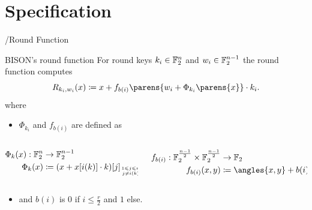 \section{Specification}
\begin{frame}{\bison/}{Round Function}
    \vspace{-45pt}
    \begin{minipage}[t][150pt][t]{0.985\textwidth}
        \begin{block}{BISON's round function\vpPp}
            \centering
            \vspace{0.5\baselineskip}
            For round keys $k_i\in \mathbb{F}_2^n$ and $w_i\in \mathbb{F}_2^{n-1}$ the round function computes
            \begin{equation*}
                R_{k_i, w_i}(x) \coloneqq x + f_{b(i)} \parens{w_i + \Phi_{k_i}\parens{x}} \cdot k_i.
            \end{equation*}
            \flushleft
            where
            \begin{itemize}
                \item $\Phi_{k_i}$ and $f_{b(i)}$ are defined as
            \end{itemize}
            \vspace{-10pt}
            \begin{columns}
                \begin{column}{0.49\textwidth}
                    \begin{align*}
                        \Phi_k(x) : \F_2^n &\to \F_2^{n-1} \\
                        \Phi_k(x) &\coloneqq (x + x[i(k)] \cdot k)[j]_{\tower{1 \leqslant j \leqslant n}{j \neq i(k)}}
                    \end{align*}
                \end{column}
                \begin{column}{0.49\textwidth}
                    \begin{align*}
                        f_{b(i)} : \F_2^{\frac{n-1}{2}}\times \F_2^{\frac{n-1}{2}} &\to \F_2 \\
                        f_{b(i)}(x,y) &\coloneqq \angles{x,y} + b(i),
                    \end{align*}
                \end{column}
            \end{columns}
            \begin{itemize}
                \item and $b(i)$ is $0$ if $i \leqslant \frac{r}{2}$ and $1$ else.
            \end{itemize}
            \vspace{-0.25\baselineskip}
        \end{block}
    \end{minipage}
\end{frame}

